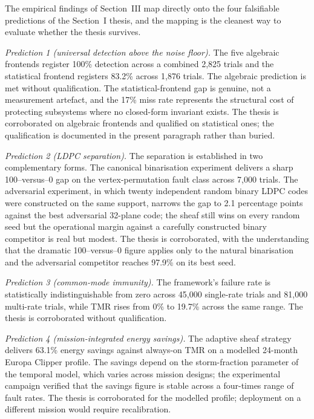 \documentclass[12pt,a4paper]{article}
\theoremstyle{plain}
\theoremstyle{definition}
\begin{document}
The empirical findings of Section~III map directly onto the four falsifiable predictions of the Section~I thesis, and the mapping is the cleanest way to evaluate whether the thesis survives.

\textit{Prediction 1 (universal detection above the noise floor).} The five algebraic frontends register 100\% detection across a combined 2{,}825 trials and the statistical frontend registers 83.2\% across 1{,}876 trials. The algebraic prediction is met without qualification. The statistical-frontend gap is genuine, not a measurement artefact, and the 17\% miss rate represents the structural cost of protecting subsystems where no closed-form invariant exists. The thesis is corroborated on algebraic frontends and qualified on statistical ones; the qualification is documented in the present paragraph rather than buried.

\textit{Prediction 2 (LDPC separation).} The separation is established in two complementary forms. The canonical binarisation experiment delivers a sharp 100--versus--0 gap on the vertex-permutation fault class across 7{,}000 trials. The adversarial experiment, in which twenty independent random binary LDPC codes were constructed on the same support, narrows the gap to 2.1 percentage points against the best adversarial 32-plane code; the sheaf still wins on every random seed but the operational margin against a carefully constructed binary competitor is real but modest. The thesis is corroborated, with the understanding that the dramatic 100--versus--0 figure applies only to the natural binarisation and the adversarial competitor reaches 97.9\% on its best seed.

\textit{Prediction 3 (common-mode immunity).} The framework's failure rate is statistically indistinguishable from zero across 45{,}000 single-rate trials and 81{,}000 multi-rate trials, while TMR rises from 0\% to 19.7\% across the same range. The thesis is corroborated without qualification.

\textit{Prediction 4 (mission-integrated energy savings).} The adaptive sheaf strategy delivers 63.1\% energy savings against always-on TMR on a modelled 24-month Europa Clipper profile. The savings depend on the storm-fraction parameter of the temporal model, which varies across mission designs; the experimental campaign verified that the savings figure is stable across a four-times range of fault rates. The thesis is corroborated for the modelled profile; deployment on a different mission would require recalibration.
\end{document}
